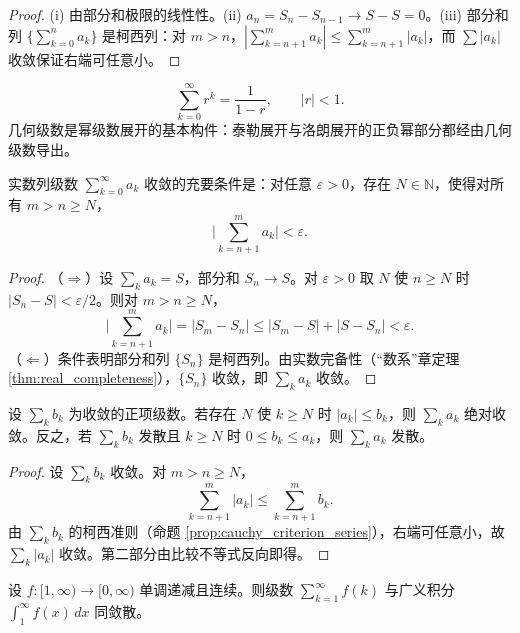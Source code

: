 \begin{proof}
(i) 由部分和极限的线性性。(ii) $a_n = S_n - S_{n-1} \to S - S = 0$。(iii) 部分和列 $\{\sum_{k=0}^{n} a_k\}$ 是柯西列：对 $m > n$，$|\sum_{k=n+1}^m a_k| \le \sum_{k=n+1}^m |a_k|$，而 $\sum |a_k|$ 收敛保证右端可任意小。
\end{proof}

\begin{example}\label{ex:geometric_series}
\[
\sum_{k=0}^{\infty} r^k = \frac{1}{1-r}, \qquad |r| < 1.
\]
几何级数是幂级数展开的基本构件：泰勒展开与洛朗展开的正负幂部分都经由几何级数导出。
\end{example}

\begin{proposition}[柯西收敛准则]\label{prop:cauchy_criterion_series}
实数列级数 $\sum_{k=0}^{\infty} a_k$ 收敛的充要条件是：对任意 $\varepsilon > 0$，存在 $N \in \mathbb{N}$，使得对所有 $m > n \ge N$，
\[
\Big| \sum_{k=n+1}^{m} a_k \Big| < \varepsilon.
\]
\end{proposition}

\begin{proof}
（$\Rightarrow$）设 $\sum_k a_k = S$，部分和 $S_n \to S$。对 $\varepsilon > 0$ 取 $N$ 使 $n \ge N$ 时 $|S_n - S| < \varepsilon/2$。则对 $m > n \ge N$，
\[
\Big| \sum_{k=n+1}^{m} a_k \Big| = |S_m - S_n| \le |S_m - S| + |S - S_n| < \varepsilon.
\]
（$\Leftarrow$）条件表明部分和列 $\{S_n\}$ 是柯西列。由实数完备性（“数系”章定理 \ref{thm:real_completeness}），$\{S_n\}$ 收敛，即 $\sum_k a_k$ 收敛。
\end{proof}

\begin{proposition}[比较判别法]\label{prop:comparison_test}
设 $\sum_k b_k$ 为收敛的正项级数。若存在 $N$ 使 $k \ge N$ 时 $|a_k| \le b_k$，则 $\sum_k a_k$ 绝对收敛。反之，若 $\sum_k b_k$ 发散且 $k \ge N$ 时 $0 \le b_k \le a_k$，则 $\sum_k a_k$ 发散。
\end{proposition}

\begin{proof}
设 $\sum_k b_k$ 收敛。对 $m > n \ge N$，
\[
\sum_{k=n+1}^{m} |a_k| \le \sum_{k=n+1}^{m} b_k.
\]
由 $\sum_k b_k$ 的柯西准则（命题 \ref{prop:cauchy_criterion_series}），右端可任意小，故 $\sum_k |a_k|$ 收敛。第二部分由比较不等式反向即得。
\end{proof}

\begin{proposition}[积分判别法]\label{prop:integral_test}
设 $f: [1, \infty) \to [0, \infty)$ 单调递减且连续。则级数 $\sum_{k=1}^{\infty} f(k)$ 与广义积分 $\int_1^{\infty} f(x)\,dx$ 同敛散。
\end{proposition}

